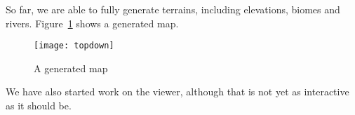 
So far, we are able to fully generate terrains, including elevations, biomes and rivers.
Figure~\ref{fig:generator} shows a generated map.

\begin{figure}[H]
	\centering
	\texttt{[image: topdown]}
	\caption{A generated map}
	\label{fig:generator}
\end{figure}

We have also started work on the viewer, although that is not yet as interactive as it should be.
